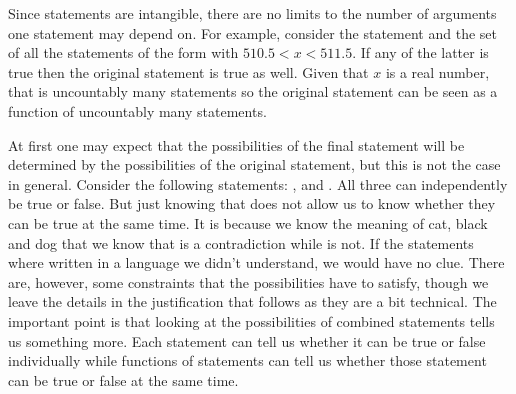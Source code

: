 \documentclass[11pt,letterpaper,fleqn]{memoir} %
\begin{document}
Since statements are intangible, there are no limits to the number of arguments one statement may depend on. For example, consider the statement  and the set of all the statements of the form  with $510.5 < x < 511.5$. If any of the latter is true then the original statement is true as well. Given that $x$ is a real number, that is uncountably many statements so the original statement can be seen as a function of uncountably many statements.

At first one may expect that the possibilities of the final statement will be determined by the possibilities of the original statement, but this is not the case in general. Consider the following statements: ,  and . All three can independently be true or false. But just knowing that does not allow us to know whether they can be true at the same time. It is because we know the meaning of cat, black and dog that we know that  is a contradiction while  is not. If the statements where written in a language we didn't understand, we would have no clue. There are, however, some constraints that the possibilities have to satisfy, though we leave the details in the justification that follows as they are a bit technical. The important point is that looking at the possibilities of combined statements tells us something more. Each statement can tell us whether it can be true or false individually while functions of statements can tell us whether those statement can be true or false at the same time.
\end{document}
